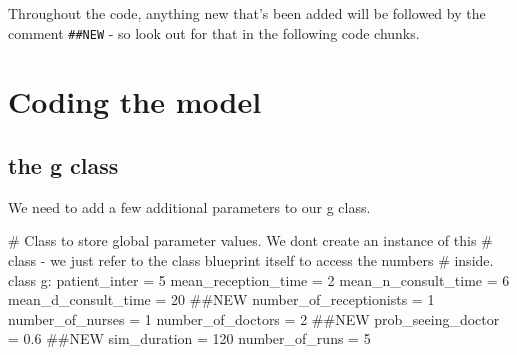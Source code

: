 \documentclass[
  letterpaper,
  DIV=11,
  numbers=noendperiod]{scrreprt}
\newenvironment{Shaded}{\begin{snugshade}}{\end{snugshade}}
\newcommand{\CommentTok}[1]{\textcolor[rgb]{0.37,0.37,0.37}{#1}}
\newcommand{\DecValTok}[1]{\textcolor[rgb]{0.68,0.00,0.00}{#1}}
\newcommand{\FloatTok}[1]{\textcolor[rgb]{0.68,0.00,0.00}{#1}}
\newcommand{\KeywordTok}[1]{\textcolor[rgb]{0.00,0.23,0.31}{#1}}
\newcommand{\NormalTok}[1]{\textcolor[rgb]{0.00,0.23,0.31}{#1}}
\newcommand{\OperatorTok}[1]{\textcolor[rgb]{0.37,0.37,0.37}{#1}}
\begin{document}
\begin{tcolorbox}[enhanced jigsaw, rightrule=.15mm, colback=white, colframe=quarto-callout-tip-color-frame, colbacktitle=quarto-callout-tip-color!10!white, toprule=.15mm, coltitle=black, opacityback=0, titlerule=0mm, bottomtitle=1mm, breakable, title=\textcolor{quarto-callout-tip-color}{\faLightbulb}\hspace{0.5em}{Tip}, opacitybacktitle=0.6, toptitle=1mm, arc=.35mm, bottomrule=.15mm, leftrule=.75mm, left=2mm]

Throughout the code, anything new that's been added will be followed by
the comment \texttt{\#\#NEW} - so look out for that in the following
code chunks.

\end{tcolorbox}

\section{Coding the model}\label{coding-the-model-1}

\subsection{the g class}\label{the-g-class-1}

We need to add a few additional parameters to our g class.

\begin{Shaded}
\begin{Highlighting}[]
\CommentTok{\# Class to store global parameter values.  We don\textquotesingle{}t create an instance of this}
\CommentTok{\# class {-} we just refer to the class blueprint itself to access the numbers}
\CommentTok{\# inside.}
\KeywordTok{class}\NormalTok{ g:}
\NormalTok{    patient\_inter }\OperatorTok{=} \DecValTok{5}
\NormalTok{    mean\_reception\_time }\OperatorTok{=} \DecValTok{2}
\NormalTok{    mean\_n\_consult\_time }\OperatorTok{=} \DecValTok{6}
\NormalTok{    mean\_d\_consult\_time }\OperatorTok{=} \DecValTok{20} \CommentTok{\#\#NEW}
\NormalTok{    number\_of\_receptionists }\OperatorTok{=} \DecValTok{1}
\NormalTok{    number\_of\_nurses }\OperatorTok{=} \DecValTok{1}
\NormalTok{    number\_of\_doctors }\OperatorTok{=} \DecValTok{2} \CommentTok{\#\#NEW}
\NormalTok{    prob\_seeing\_doctor }\OperatorTok{=} \FloatTok{0.6} \CommentTok{\#\#NEW}
\NormalTok{    sim\_duration }\OperatorTok{=} \DecValTok{120}
\NormalTok{    number\_of\_runs }\OperatorTok{=} \DecValTok{5}
\end{Highlighting}
\end{Shaded}
\end{document}
